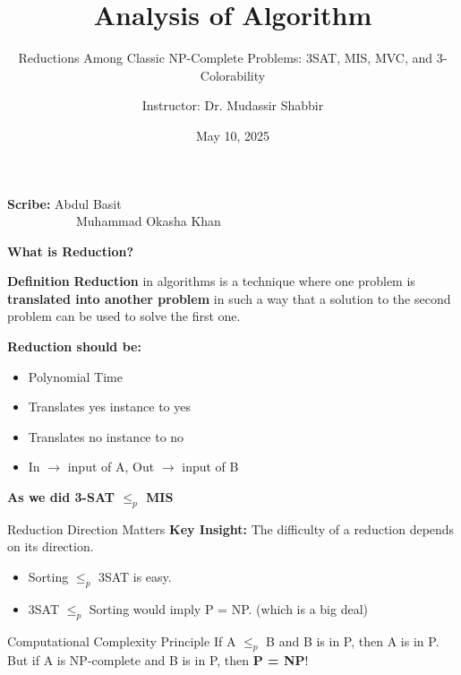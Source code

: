 \documentclass{beamer}
\title{Analysis of Algorithm}
\subtitle{Reductions Among Classic NP-Complete Problems: 3SAT, MIS, MVC, and 3-Colorability}
\author{Instructor: Dr. Mudassir Shabbir}
\institute{ITU}
\date{May 10, 2025}
\begin{document}
\begin{frame}
    \titlepage
    \vspace{1cm}
    \textbf{Scribe:}
 Abdul Basit  \\ \ \ \ \ \ \ \ \ \ \ \ Muhammad Okasha Khan
\end{frame}



\begin{frame}{\Large \textbf{What is Reduction?}}
    \begin{alertblock}{\textbf{Definition}}
        \textbf{Reduction} in algorithms is a technique where one problem is \textbf{translated into another problem} in such a way that a solution to the second problem can be used to solve the first one.
    \end{alertblock}

    \begin{alertblock}{\textbf{Reduction should be:}}
        \begin{itemize}
            \item Polynomial Time
            \item Translates yes instance to yes
            \item Translates no instance to no
            \item In $\rightarrow$ input of A, Out $\rightarrow$ input of B
        \end{itemize}
    \end{alertblock}
    \textbf{As we did 3-SAT $\leq_p$ MIS}
\end{frame}


\begin{frame}{Reduction Direction Matters}
    \textbf{Key Insight:} The difficulty of a reduction depends on its direction.
    
    \begin{itemize}
        \item Sorting $\leq_p$ 3SAT is easy.
        \item 3SAT $\leq_p$ Sorting would imply P = NP. (which is a big deal)
    \end{itemize}
    
    \begin{alertblock}{Computational Complexity Principle}
        If A $\leq_p$ B and B is in P, then A is in P. \\
        But if A is NP-complete and B is in P, then \textbf{P = NP}!
    \end{alertblock}
\end{frame}
\end{document}
